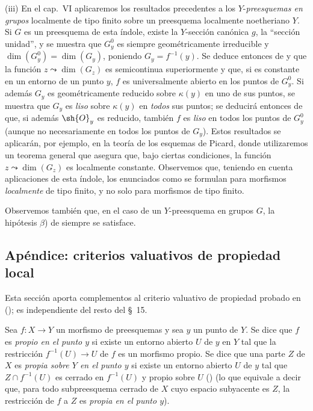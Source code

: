 \begin{remarks}[15.6.10]
(iii)
En el cap.\ VI aplicaremos los resultados precedentes a los $Y$-\emph{preesquemas en grupos} localmente de tipo finito sobre un preesquema localmente noetheriano $Y$.
Si $G$ es un preesquema de esta índole, existe la $Y$-sección canónica $g$, la ``sección unidad'', y se muestra que $G_y^0$ es siempre geométricamente irreducible y $\dim(G_y^0)=\dim(G_y)$, poniendo $G_y=f^{-1}(y)$.
Se deduce entonces de  y  que la función $z\leadsto\dim(G_z)$ es semicontinua superiormente y que, si es constante en un entorno de un punto $y$, $f$ es universalmente abierto en los puntos de $G_y^0$.
Si además $G_y$ es geométricamente reducido sobre $\kappa(y)$ en uno de sus puntos, se muestra que $G_y$ es \emph{liso}  sobre $\kappa(y)$ en \emph{todos} sus puntos; se deducirá entonces de  que, si además $\sh{O}_y$ es reducido, también $f$ es \emph{liso} en todos los puntos de $G_y^0$ (aunque no necesariamente en todos los puntos de $G_y$).
Estos resultados se aplicarán, por ejemplo, en la teoría de los esquemas de Picard, donde utilizaremos un teorema general que asegura que, bajo ciertas condiciones, la función $z\leadsto\dim(G_z)$ es localmente constante.
Observemos que, teniendo en cuenta aplicaciones de esta índole, los enunciados como  se formulan para morfismos \emph{localmente} de tipo finito, y no solo para morfismos de tipo finito.

Observemos también que, en el caso de un $Y$-preesquema en grupos $G$, la hipótesis $\beta$) de  siempre se satisface.
\end{remarks}


\subsection{Apéndice: criterios valuativos de propiedad local}
\label{subsection:IV.15.7}

Esta sección aporta complementos al criterio valuativo de propiedad probado en (); es independiente del resto del \S~15.

\begin{definition}[15.7.1]
\label{IV.15.7.1}
Sea $f:X\to Y$ un morfismo de preesquemas y sea $y$ un punto de $Y$.
Se dice que $f$ es \emph{propio en el punto $y$} si existe un entorno abierto $U$ de $y$ en $Y$ tal que la restricción $f^{-1}(U)\to U$ de $f$ es un morfismo propio.
Se dice que una parte $Z$ de $X$ es \emph{propia sobre $Y$ en el punto $y$} si existe un entorno abierto $U$ de $y$ tal que $Z\cap f^{-1}(U)$ es cerrado en $f^{-1}(U)$ y propio sobre $U$ () \textup{(lo que equivale a decir que, para todo subpreesquema cerrado de $X$ cuyo espacio subyacente es $Z$, la restricción de $f$ a $Z$ es \emph{propia en el punto $y$})}.
\end{definition}

